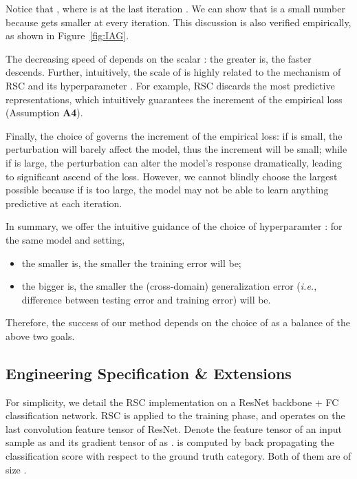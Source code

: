 \documentclass[runningheads]{llncs}
\newcommand{\method}{RSC}
\begin{document}
Notice that , 
where  is  at the last iteration . 
We can show that  is a small number 
because  gets smaller at every iteration. 
This discussion is also verified empirically,
as shown in Figure~\ref{fig:IAG}. 


The decreasing speed of  depends on the scalar : the greater  is, the faster  descends. Further, intuitively, the scale of  is highly related to the mechanism of \method{} and its hyperparameter . For example, \method{} discards the most predictive representations, which intuitively guarantees the increment of the empirical loss (Assumption \textbf{A4}). 

Finally, the choice of  governs the increment of the empirical loss:
if  is small, the perturbation will barely affect the model, 
thus the increment will be small;
while if  is large, the perturbation can alter the model's response 
dramatically, leading to significant ascend of the loss. 
However, we cannot blindly choose the largest possible  
because if  is too large, 
the model may not be able to learn anything predictive at each iteration. 

In summary, we offer the intuitive guidance of the choice of hyperparamter : 
for the same model and setting, 
\begin{itemize}
    \item the smaller  is, the smaller the training error will be;
    \item the bigger  is, the smaller the (cross-domain) generalization error (\textit{i.e.}, difference between testing error and training error) will be. 
\end{itemize}
Therefore, the success of our method depends on the choice of  
as a balance of the above two goals. 





\subsection{Engineering Specification \& Extensions}






For simplicity, we detail the \method{} implementation on a ResNet backbone + FC classification network. 
\method{} is applied to the training phase, and operates on the last convolution feature tensor of ResNet. Denote the feature tensor of an input sample as  and its gradient tensor of as .  is computed by back propagating the classification score with respect to the ground truth category. Both of them are of size . 
\end{document}
